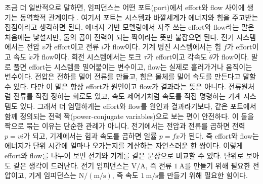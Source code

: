 조금 더 일반적으로 말하면, 임피던스는 어떤 포트(port)에서 effort와 flow 사이에 생기는 동역학적 관계이다 \cite{hogan1985impedancepart1}.
여기서 포트는 시스템과 바깥세계가 에너지와 힘을 주고받는 접점이라고 생각하면 된다.
에너지 기반 모델링에서 자주 쓰는 effort와 flow라는 말은 처음에는 낯설지만, 둘의 곱이 전력이 되는 짝이라는 뜻만 붙잡으면 된다.
전기 시스템에서는 전압 $v$가 effort이고 전류 $i$가 flow이다.
기계 병진 시스템에서는 힘 $f$가 effort이고 속도 $\dot{x}$가 flow이다.
회전 시스템에서는 토크 $\tau$가 effort이고 각속도 $\dot{\theta}$가 flow이다.
말로 풀면 effort는 시스템을 밀어붙이는 변수이고, flow는 실제로 흘러가거나 움직이는 변수이다.
전압은 전하를 밀어 전류를 만들고, 힘은 물체를 밀어 속도를 만든다고 말할 수 있다.
다만 이 말은 항상 effort가 원인이고 flow가 결과라는 뜻은 아니다.
전류원처럼 전류를 직접 정하는 회로도 있고, 속도 제어기처럼 속도를 직접 명령하는 기계 시스템도 있다.
그래서 더 엄밀하게는 effort와 flow를 원인과 결과라기보다, 같은 포트에서 함께 정의되는 전력 짝(power-conjugate variables)으로 보는 편이 안전하다.
이 둘을 짝으로 묶는 이유는 단순한 관례가 아니다.
전기에서는 전압과 전류를 곱하면 전력 $p=vi$가 되고, 기계에서는 힘과 속도를 곱하면 일률 $p=f\dot{x}$가 된다.
즉 effort와 flow는 에너지가 단위 시간에 얼마나 오가는지를 계산하는 자연스러운 한 쌍이다.
이렇게 effort와 flow를 나누어 보면 전기와 기계를 같은 문장으로 비교할 수 있다.
단위로 보아도 같은 생각이 드러난다.
전기 임피던스는 $\mathrm{V/A}$, 즉 전류 $1~\mathrm{A}$를 만들기 위해 필요한 전압이고, 기계 임피던스는 $\mathrm{N/(m/s)}$, 즉 속도 $1~\mathrm{m/s}$를 만들기 위해 필요한 힘이다.

